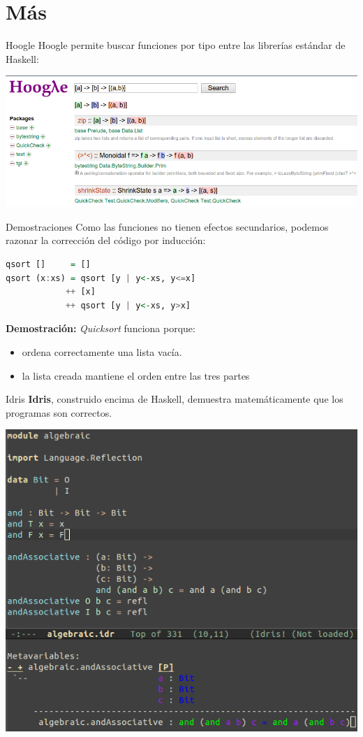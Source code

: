 \section{Más}

\begin{frame}[fragile]{Hoogle}
  Hoogle permite buscar funciones por tipo entre las librerías
  estándar de Haskell:
  
  \begin{center}
  \includegraphics[scale=0.35]{./images/hoogle.png}
  \end{center}
\end{frame}


\begin{frame}[fragile]{Demostraciones}
  Como las funciones no tienen efectos secundarios, podemos razonar la
  corrección del código por inducción:

  \begin{lstlisting}[language=haskell]
qsort []     = []
qsort (x:xs) = qsort [y | y<-xs, y<=x]
            ++ [x]
            ++ qsort [y | y<-xs, y>x]
  \end{lstlisting}

  \textbf{Demostración:} \textit{Quicksort} funciona porque:
  \begin{itemize}
   \item ordena correctamente una lista vacía.
   \item la lista creada mantiene el orden entre las tres partes
  \end{itemize}
\end{frame}


\begin{frame}[fragile]{Idris}
  \textbf{Idris}, construido encima de Haskell, demuestra
  matemáticamente que los
  programas son correctos.
  
  \begin{center}
  \includegraphics[scale=0.28]{./images/idris.png}
  \end{center}
\end{frame}
